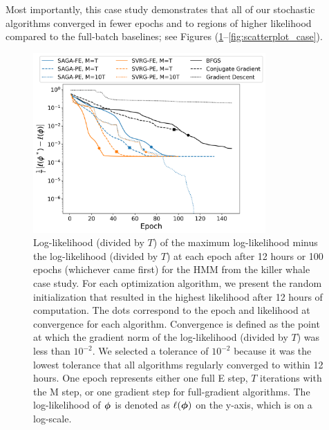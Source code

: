 Most importantly, this case study demonstrates that all of our stochastic algorithms converged in fewer epochs and to regions of higher likelihood compared to the full-batch baselines; see Figures (\ref{fig:ll_trace_case}--\ref{fig:scatterplot_case}).
%
\begin{figure}[h]
    \centering
    \includegraphics[width=3.5in]{../plt/log-like_v_epoch_K-3-3.png}
    \caption{Log-likelihood (divided by $T$) of the maximum log-likelihood minus the log-likelihood (divided by $T$) at each epoch after 12 hours or 100 epochs (whichever came first) for the HMM from the killer whale case study. For each optimization algorithm, we present the random initialization that resulted in the highest likelihood after 12 hours of computation. The dots correspond to the epoch and likelihood at convergence for each algorithm. Convergence is defined as the point at which the gradient norm of the log-likelihood (divided by $T$) was less than $10^{-2}$. We selected a tolerance of $10^{-2}$ because it was the lowest tolerance that all algorithms regularly converged to within 12 hours. One epoch represents either one full E step, $T$ iterations with the M step, or one gradient step for full-gradient algorithms. The log-likelihood of $\boldsymbol{\phi}$ is denoted as $\ell(\boldsymbol{\phi})$ on the y-axis, which is on a log-scale.}
    \label{fig:ll_trace_case}
\end{figure}
%
